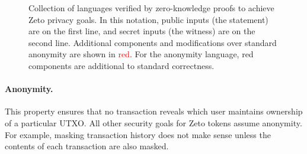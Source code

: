 \begin{figure}
\begin{pcvstack}[boxed, center, space=2em]
\begin{pchstack}[center, space=1em]

      \end{pchstack}
    \end{pcvstack} %
    \caption{Collection of languages verified by zero-knowledge proofs to achieve Zeto privacy goals. In this notation, public inputs (the statement) are on the first line, and secret inputs (the witness) are on the second line. Additional components and modifications over standard anonymity are shown in \textcolor{red}{red}. For the anonymity language, red components are additional to standard correctness.}
    \label{fig:zeto_proofs}
\end{figure}


\paragraph{Anonymity.} This property ensures that no transaction reveals which user maintains ownership of a particular UTXO. All other security goals for Zeto tokens assume anonymity. For example, masking transaction history does not make sense unless the contents of each transaction are also masked.

